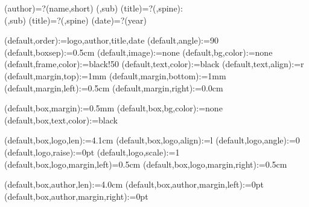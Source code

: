 
%


\makeatletter




\spine(author)=?{\thedocauthor(name,short)}
(\@LANG@COVER,sub){%
  \spine(title)=?{\thedoctitle(\@LANG@COVER,spine):\\\thedoctitle(\@LANG@COVER,sub)}
}{%
  \spine(title)=?{\thedoctitle(\@LANG@COVER,spine)}
}
\spine(date)=?{\thentdocdate(year)}


\spine(default,order):={logo,author,title,date}
\spine(default,angle):={90}
\spine(default,boxsep):={0.5cm}
\spine(default,image):={none}
\spine(default,bg,color):={none}
\spine(default,frame,color):={black!50}
\spine(default,text,color):={black}
\spine(default,text,align):={r}
\spine(default,margin,top):={1mm}
\spine(default,margin,bottom):={1mm}
\spine(default,margin,left):={0.5cm}
\spine(default,margin,right):={0.0cm}

\spine(default,box,margin):={0.5mm}
\spine(default,box,bg,color):={none}
\spine(default,box,text,color):={black}

\spine(default,box,logo,len):={4.1cm}
\spine(default,box,logo,align):={l}
\spine(default,logo,angle):={0}
\spine(default,logo,raise):={0pt}
\spine(default,logo,scale):={1}
\spine(default,box,logo,margin,left)={0.5cm}
\spine(default,box,logo,margin,right):={0.5cm}

\spine(default,box,author,len):={4.0cm}
\spine(default,box,author,margin,left):={0pt}
\spine(default,box,author,margin,right):={0pt}

